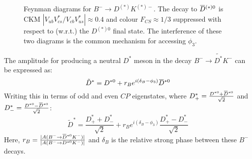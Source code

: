 \documentclass[oneside,12pt]{article}
\newcommand{\overbar}[1]{\mkern 1.5mu\overline{\mkern-1.5mu#1\mkern-1.5mu}\mkern
1.5mu}
\begin{document}
\begin{figure}[H]
\centering
{}
	\caption{\small{Feynman diagrams for ${B}^{-}\rightarrow{D}^{(*)}{K}^{(*)-}$}.
The decay to $\overbar{{D}}^{(*)0}$ is CKM
$|V_{ub}V^{*}_{cs}/V_{cb}V^{*}_{us}|\approx0.4$ and colour ${F}_{CS}\approx1/3$
suppressed with respect to (w.r.t.) the ${D}^{(*)0}$ final state. The
interference of these two diagrams is the common mechanism for accessing
$\phi_3$.}
	\label{fig:B2DstarKstar}
	\vspace{-10pt}
\end{figure}

\noindent The amplitude for producing a neutral ${D}^*$ meson in the decay $B^-\rightarrow \tilde{D^*}K^-$ can be expressed as:
  \begin{equation}
    \tilde{D}^*=D^{*0}+r_Be^{i(\delta_B-\phi_3)}\overbar{D}^{*0}
    \label{eq:DstTilde}
  \end{equation}
\noindent Writing this in terms of odd and even $CP$ eigenstates, where
$D^{*}_{+}=\frac{D^{*0}+\overbar{D}^{*0}}{\sqrt{2}}$ and
$D^{*}_{-}=\frac{D^{*0}-\overbar{D}^{*0}}{\sqrt{2}}$:
  \begin{equation}
    \tilde{D}^*=\frac{D^{*}_{+}+D^{*}_{-}}{\sqrt{2}}+r_Be^{i(\delta_B-\phi_3)}\frac{D^{*}_{+}-D^{*}_{-}}{\sqrt{2}}
    \label{eq:DstTildeCP}
  \end{equation}
\noindent Here, $r_B=\frac{|A(B^{-}\rightarrow
\overbar{D}^{*0}K^-)|}{|A(B^{-}\rightarrow {D}^{*0}K^-)|}$ and $\delta_{B}$ is
the relative strong phase between these $B^-$ decays.
 
\end{document}
